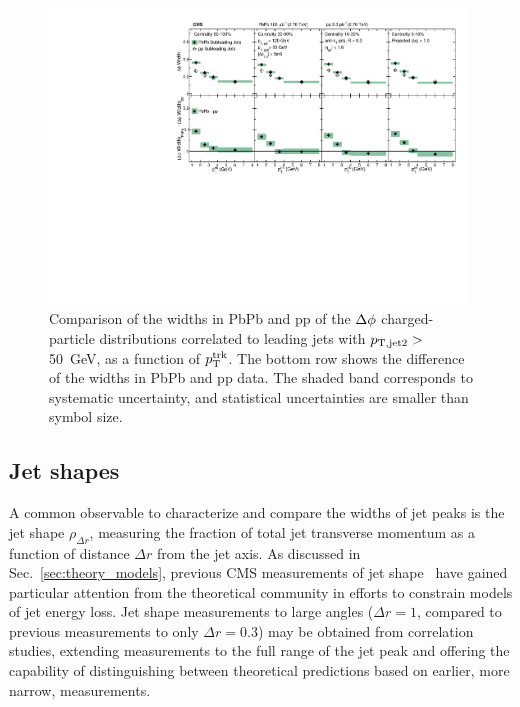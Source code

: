 \begin{figure}[hbtp]
\begin{center}
\includegraphics[width=0.99\textwidth]{figures/Results/Width_Phi_SubLeading.pdf}
\caption[Subleading jet $\Delta\phi$ correlation widths as a function of $p_{\rm T}^{\rm trk}$ at 2.76 TeV]{Comparison of the widths in PbPb and pp of the $\protect\Delta\phi$ charged-particle distributions correlated to leading jets with $p_{\rm T, jet2}>$ 50~GeV, as a function of $p_{\rm T}^{\rm trk}$.  The bottom row shows the difference of the widths in PbPb and pp data.  The shaded band corresponds to systematic uncertainty, and statistical uncertainties are smaller than symbol size.}
\label{fig:Width_phi_sub}
\end{center}
\end{figure}



\clearpage


\subsection{Jet shapes}
\label{sec:jet_shapes}

A common observable to characterize and compare the widths of jet peaks is the jet shape $\rho_{\Delta r}$, measuring the fraction of total jet transverse momentum as a function of distance $\Delta r$ from the jet axis.  As discussed in Sec.~\ref{sec:theory_models}, previous CMS measurements of jet shape~\cite{Chatrchyan:2013kwa} have gained particular attention from the theoretical community in efforts to constrain models of jet energy loss.  Jet shape measurements to large angles ($\Delta r = 1$, compared to previous measurements to only $\Delta r = 0.3$) may be obtained from correlation studies, extending measurements to the full range of the jet peak and offering the capability of distinguishing between theoretical predictions based on earlier, more narrow, measurements.  

